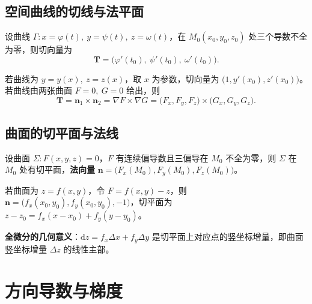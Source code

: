 \subsection{空间曲线的切线与法平面}

设曲线 $\Gamma:x=\varphi(t),\ y=\psi(t),\ z=\omega(t)$，在 $M_0(x_0,y_0,z_0)$ 处三个导数不全为零，则切向量为
\begin{equation}
\boldsymbol T=\bigl(\varphi'(t_0),\ \psi'(t_0),\ \omega'(t_0)\bigr).
\end{equation}


若曲线为 $y=y(x),\ z=z(x)$，取 $x$ 为参数，切向量为 $\bigl(1,y'(x_0),z'(x_0)\bigr)$。若曲线由两张曲面 $F=0,\ G=0$ 给出，则
\begin{equation}
\boldsymbol T=\boldsymbol n_1\times\boldsymbol n_2=\nabla F\times\nabla G
=\bigl(F_x,F_y,F_z\bigr)\times\bigl(G_x,G_y,G_z\bigr).
\end{equation}

\subsection{曲面的切平面与法线}

设曲面 $\Sigma:F(x,y,z)=0$，$F$ 有连续偏导数且三偏导在 $M_0$ 不全为零，则 $\Sigma$ 在 $M_0$ 处有切平面，\textbf{法向量} $\boldsymbol n=\bigl(F_x(M_0),F_y(M_0),F_z(M_0)\bigr)$。


若曲面为 $z=f(x,y)$，令 $F=f(x,y)-z$，则 $\boldsymbol n=\bigl(f_x(x_0,y_0),f_y(x_0,y_0),-1\bigr)$，切平面为 $z-z_0=f_x(x-x_0)+f_y(y-y_0)$。

\textbf{全微分的几何意义}：$\mathrm dz=f_x\Delta x+f_y\Delta y$ 是切平面上对应点的竖坐标增量，即曲面竖坐标增量 $\Delta z$ 的线性主部。


\section{方向导数与梯度}

